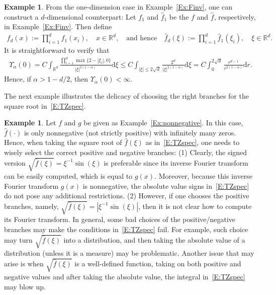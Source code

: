 \documentclass[a4paper,11pt]{article}%
\theoremstyle{plain}
\theoremstyle{definition}
\newtheorem{example}[theorem]{Example}
\numberwithin{equation}{section}
\newcommand{\R}{\mathbb{R}}
\newcommand{\ud}{\ensuremath{\mathrm{d}}}
\begin{document}
\begin{example}\label{Ex:Finv-d}
  From the one-dimension case in Example~\ref{Ex:Finv}, one can construct a $d$-dimensional
  counterpart: Let $f_1$ and $\widehat{f}_1$ be the $f$ and $\widehat{f}$, respectively, in
  Example~\ref{Ex:Finv}. Then define
	\begin{align*}
    f_d(x) := \prod_{i=1}^d f_1(x_i), \quad x\in\R^d, \quad \text{and hence} \quad
    \widehat{f}_d(\xi) := \prod_{i=1}^d \widehat{f}_1(\xi_i), \quad \xi\in\R^d.
	\end{align*}
  It is straightforward to verify that
	\begin{align*}
    \Upsilon_\alpha(0)
    = C \int_{\R^d} \frac{\prod_{i = 1}^d\max\{2-|\xi_i|,0\}}{|\xi|^{2(1-\alpha)}} \ud \xi
    \le C \int_{|\xi|\le 2\sqrt{d}} \frac{2^d}{|\xi|^{2(1-\alpha)}} \ud \xi
    = C \int_{0}^{2\sqrt{d}} \frac{r^{d-1}}{r^{2(1-\alpha)}} \ud r.
	\end{align*}
  Hence, if $\alpha > 1-d /2$, then $\Upsilon_\alpha(0)<\infty$.
\end{example}


The next example illustrates the delicacy of choosing the right branches for the square root
in~\eqref{E:TZspec}.

\begin{example}\label{Ex:sqrt}
  Let $f$ and $g$ be given as Example~\ref{Ex:nonnegative}. In this case, $\widehat{f}(\cdot)$ is
  only nonnegative (not strictly positive) with infinitely many zeros. Hence, when taking the square
  root of $\widehat{f}(\xi)$ as in~\eqref{E:TZspec}, one needs to wisely select the correct positive
  and negative branches: (1) Clearly, the signed version $\sqrt{\widehat{f}(\xi)} =
  \xi^{-1}\sin(\xi)$ is preferable since its inverse Fourier transform can be easily computed, which
  is equal to $g(x)$. Moreover, because this inverse Fourier transform $g(x)$ is nonnegative, the
  absolute value signs in~\eqref{E:TZspec} do not pose any additional restrictions. (2) However, if
  one chooses the positive branches, namely, $\sqrt{\widehat{f}(\xi)} =
  \left|\xi^{-1}\sin(\xi)\right|$, then it is not clear how to compute its Fourier transform. In
  general, some bad choices of the positive/negative branches may make the conditions
  in~\eqref{E:TZspec} fail. For example, such choice may turn $\sqrt{\widehat{f}(\xi)}$ into a
  distribution, and then taking the absolute value of a distribution (unless it is a measure) may be
  problematic. Another issue that may arise is when $\sqrt{\widehat{f}(\xi)}$ is a well-defined
  function, taking on both positive and negative values and after taking the absolute value, the
  integral in~\eqref{E:TZspec} may blow up.
\end{example}
\end{document}
